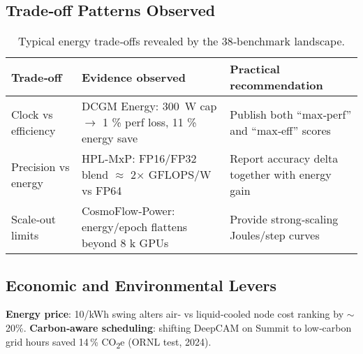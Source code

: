 
\subsection{Trade‑off Patterns Observed}



\begin{table}[ht]
  \centering
  \caption{Typical energy trade‑offs revealed by the 38‑benchmark landscape.}
  \label{tab:tradeoffs}
  \footnotesize
  \renewcommand{\arraystretch}{1.05}
  \setlength{\tabcolsep}{3pt}
  \begin{tabularx}{\columnwidth}{@{} l X X @{}}
    \toprule
    \textbf{Trade‑off} & \textbf{Evidence observed} & \textbf{Practical recommendation} \\ \midrule
    Clock vs efficiency & DCGM Energy: \SI{300}{\watt} cap $\rightarrow$ 1 \% perf loss, 11 \% energy save & Publish both ``max‑perf'' and ``max‑eff'' scores \\ 
    Precision vs energy & HPL‑MxP: FP16/FP32 blend $\approx$ 2× GFLOPS/W vs FP64 & Report accuracy delta together with energy gain \\ 
    Scale‑out limits    & CosmoFlow‑Power: energy/epoch flattens beyond 8 k GPUs & Provide strong‑scaling Joules/step curves \\ \bottomrule
  \end{tabularx}
\end{table}


\subsection{Economic and Environmental Levers}


\vspace{2pt}
\noindent
\textbf{Energy price}: \SI{10}{\cent}/kWh swing alters air‑ vs liquid‑cooled
node cost ranking by $\sim$20\%.  
\textbf{Carbon‑aware scheduling}: shifting DeepCAM on Summit to low‑carbon grid
hours saved 14\,\% CO\textsubscript{2}e (ORNL test, 2024).  


